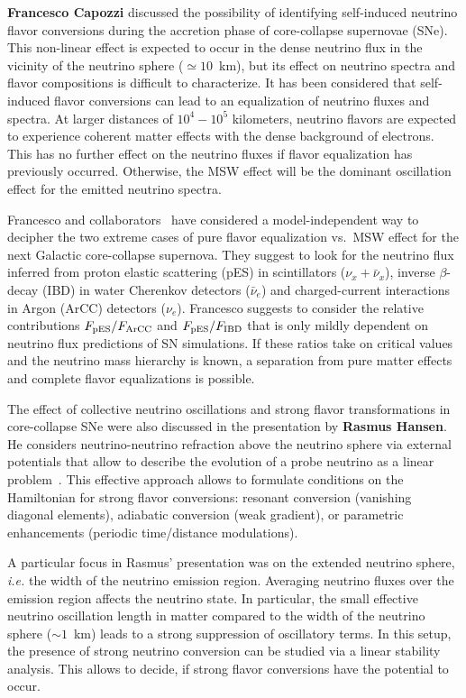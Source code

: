\documentclass{PoS}
\begin{document}
{\bf Francesco Capozzi} discussed the possibility of identifying self-induced neutrino flavor conversions during the accretion phase of core-collapse supernovae (SNe). This non-linear effect is expected to occur in the dense neutrino flux in the vicinity of the neutrino sphere ($\simeq10$~km), but its effect on neutrino spectra and flavor compositions is difficult to characterize. It has been considered that self-induced flavor conversions can lead to an equalization of neutrino fluxes and spectra. At larger distances of $10^4-10^5$ kilometers, neutrino flavors are expected to experience coherent matter effects with the dense background of electrons. This has no further effect on the neutrino fluxes if flavor equalization has previously occurred. Otherwise, the MSW effect will be the dominant oscillation effect for the emitted neutrino spectra.

Francesco and collaborators~\cite{Capozzi:2018rzl} have considered a model-independent way to decipher the two extreme cases of pure flavor equalization vs.~MSW effect for the next Galactic core-collapse supernova. They suggest to look for the neutrino flux inferred from proton elastic scattering (pES) in scintillators ($\nu_x + \bar\nu_x$), inverse $\beta$-decay (IBD) in water Cherenkov detectors ($\bar\nu_e$) and charged-current interactions in Argon (ArCC) detectors ($\nu_e$). Francesco suggests to consider the relative contributions $F_{\rm pES}/F_{\rm ArCC}$ and $F_{\rm pES}/F_{\rm IBD}$ that is only mildly dependent on neutrino flux predictions of SN simulations. If these ratios take on critical values and the neutrino mass hierarchy is known, a separation from pure matter effects and complete flavor equalizations is possible.

The effect of collective neutrino oscillations and strong flavor transformations in core-collapse SNe were also discussed in the presentation by {\bf Rasmus Hansen}. He considers neutrino-neutrino refraction above the neutrino sphere via external potentials that allow to describe the evolution of a probe neutrino as a linear problem~\cite{Hansen:2018apu}. This effective approach allows to formulate conditions on the Hamiltonian for strong flavor conversions: resonant conversion (vanishing diagonal elements), adiabatic conversion (weak gradient), or parametric enhancements (periodic time/distance modulations).

A particular focus in Rasmus' presentation was on the extended neutrino sphere, {\it i.e.} the width of the neutrino emission region. Averaging neutrino fluxes over the emission region affects the neutrino state. In particular, the small effective neutrino oscillation length in matter compared to the width of the neutrino sphere ($\sim1$~km) leads to a strong suppression of oscillatory terms. In this setup, the presence of strong neutrino conversion can be studied via a linear stability analysis. This allows to decide, if strong flavor conversions have the potential to occur.
\end{document}
